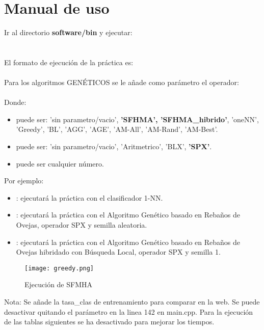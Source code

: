 \section{Manual de uso}
Ir al directorio \textbf{software/bin} y ejecutar:\\ 
\\\quad\\
El formato de ejecución de la práctica es:\\
\\

Para los algoritmos GENÉTICOS se le añade como parámetro el operador:\\
\\

Donde:
\begin{itemize}
	\item {} puede ser: 'sin parametro/vacio', \textbf{'SFHMA', 'SFHMA\_hibrido'},  'oneNN', 'Greedy', 'BL', 'AGG', 'AGE', 'AM-All', 'AM-Rand', 'AM-Best'.
	
	\item {} puede ser: 'sin parametro/vacio', 'Aritmetrico', 'BLX', \textbf{'SPX'}.
	\item {} puede ser cualquier número.
\end{itemize}

Por ejemplo:
\begin{itemize}
	\item {}: ejecutará la práctica con el clasificador 1-NN.
	\item {}: ejecutará la práctica con el Algoritmo Genético basado en Rebaños de Ovejas, operador SPX y semilla aleatoria.
	\item {}: ejecutará la práctica con el Algoritmo Genético basado en Rebaños de Ovejas hibridado con Búsqueda Local, operador SPX y semilla 1.
\end{itemize}

\begin{figure}[H]
	\centering
	\texttt{[image: greedy.png]}
	\caption{Ejecución de SFMHA}
	\label{fig:greedy}
\end{figure}
Nota: Se añade la tasa\_clas de entrenamiento para comparar en la web. Se puede desactivar quitando el parámetro  en la linea 142 en main.cpp. Para la ejecución de las tablas siguientes se ha desactivado para mejorar los tiempos. \\



